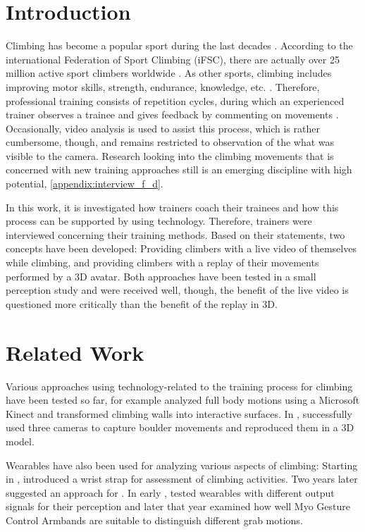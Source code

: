 \section{Introduction}
\label{sec:introduction}

Climbing has become a popular sport during the last decades \autocite{freizeitklettern}. According to the international Federation of Sport Climbing (iFSC),  there are actually over 25 million active sport climbers worldwide \autocite{IFSC:figures}. As other sports, climbing includes improving motor skills, strength, endurance, knowledge, etc. \autocite{Kajastila:2014}. Therefore, professional training consists of repetition cycles, during which an experienced trainer observes a trainee and gives feedback by commenting on movements \autocite{Ladha:2013:CSA:2493432.2493492}. Occasionally, video analysis is used to assist this process, which is rather cumbersome, though, and remains restricted to observation of the what was visible to the camera. Research looking into the climbing movements that is concerned with new training approaches still is an emerging discipline with high potential, \cf \ref{appendix:interview_f_d}.

In this work, it is investigated how trainers coach their trainees and how this process can be supported by using technology. Therefore, trainers were interviewed concerning their training methods. Based on their statements, two concepts have been developed: Providing climbers with a live video of themselves while climbing, and providing climbers with a replay of their movements performed by a 3D avatar. Both approaches have been tested in a small perception study and were received well, though, the benefit of the live video is questioned more critically than the benefit of the replay in 3D.

\section{Related Work}

Various approaches using technology-related to the training process for climbing have been tested so far, for example \textcite{Cha2015} analyzed full body motions using a Microsoft Kinect and \textcite{Kajastila:2014:ACI:2611780.2581139} transformed climbing walls into interactive surfaces. In \citeyear{weikersdorfer2016tracking}, \textcite{weikersdorfer2016tracking} successfully used three cameras to capture boulder movements and reproduced them in a 3D model.

Wearables have also been used for analyzing various aspects of climbing: Starting in \citeyear{Ladha:2013:CSA:2493432.2493492}, \textcite{Ladha:2013:CSA:2493432.2493492} introduced a wrist strap for assessment of climbing activities. Two years later \textcite{Kalyanaraman:2015:ARC:2800835.2800856} suggested an approach for . In early \citeyear{Kosmalla:2016:CIP:2858036.2858562}, \textcite{Kosmalla:2016:CIP:2858036.2858562} tested wearables with different output signals for their perception and later that year \textcite{Schulz:2016} examined how well Myo Gesture Control Armbands are suitable to distinguish different grab motions.

